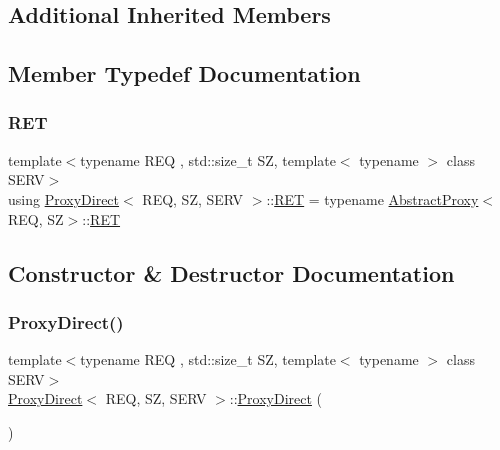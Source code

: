 \subsection*{Additional Inherited Members}


\subsection{Member Typedef Documentation}
\mbox{\label{classProxyDirect_a7ea817de80b380e39bdf58a9ef25726a}} 
\subsubsection{\texorpdfstring{R\+ET}{RET}}
{\footnotesize\ttfamily template$<$typename R\+EQ , std\+::size\+\_\+t SZ, template$<$ typename $>$ class S\+E\+RV$>$ \\
using \hyperlink{classProxyDirect}{Proxy\+Direct}$<$ R\+EQ, SZ, S\+E\+RV $>$\+::\hyperlink{classAbstractProxy_ab2af611a27c14916a27d0e9249f0291b}{R\+ET} =  typename \hyperlink{classAbstractProxy}{Abstract\+Proxy}$<$R\+EQ, SZ$>$\+::\hyperlink{classAbstractProxy_ab2af611a27c14916a27d0e9249f0291b}{R\+ET}}



\subsection{Constructor \& Destructor Documentation}
\mbox{\label{classProxyDirect_a2c7e97bb43a6418010031f7aa9c5d79b}} 
\subsubsection{\texorpdfstring{Proxy\+Direct()}{ProxyDirect()}}
{\footnotesize\ttfamily template$<$typename R\+EQ , std\+::size\+\_\+t SZ, template$<$ typename $>$ class S\+E\+RV$>$ \\
\hyperlink{classProxyDirect}{Proxy\+Direct}$<$ R\+EQ, SZ, S\+E\+RV $>$\+::\hyperlink{classProxyDirect}{Proxy\+Direct} (\begin{DoxyParamCaption}{ }\end{DoxyParamCaption})\hspace{0.3cm}{\ttfamily [inline]}}



